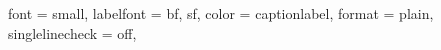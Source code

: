 
\lefoot*%
{%
    {\color{stroke1}\rule{\myoutermargin - \mymargininnersep}{0.5 mm}}\\
    \begin{minipage}[b]{\myoutermargin - \mymargininnersep}%
        \raggedleft\normalfont\color{footerpagenr}\textbf{\thepage}%
    \end{minipage}%
}
\rofoot*%
{%
    {\color{stroke1}\rule{\myoutermargin - \mymargininnersep}{0.5 mm}}\\
    \begin{minipage}[b]{\myoutermargin - \mymargininnersep}%
        \raggedright\normalfont\color{footerpagenr}\textbf{\thepage}%
    \end{minipage}%
}



\usepackage{caption}
\captionsetup
{
    font = small,
    labelfont = {bf, sf, color = captionlabel},
    format = plain,
    singlelinecheck = off,
}


\usepackage{tikz} %

\newlength{\mytmpa}
\setlength{\mytmpa}{1 mm}
\newlength{\mytmpb}
\newlength{\mytmpc}

